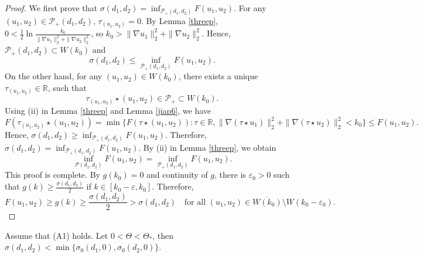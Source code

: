 \documentclass[reqno]{amsart}
\begin{document}
\begin{proof}
We first prove that $\sigma(d_1,d_2)=\inf_{\mathcal{P}_+(d_1,d_2)}F(u_1,u_2)$.
For any $(u_1,u_2)\in\mathcal{P}_+(d_1,d_2)$, $\tau_{(u_1,u_2)}=0$. 
By Lemma \ref{threep},
$0<\frac{1}{2}\ln\frac{k_0}{\| \nabla u_1\|_2^2+\| \nabla u_2\|_2^2}$,
so $k_0>\| \nabla u_1\|_2^2+
\| \nabla u_2\|_2^2$. Hence, $\mathcal{P}_+(d_1,d_2)\subset W(k_0)$ and
\[
\sigma(d_1,d_2)\leq\inf_{\mathcal{P}_+(d_1,d_2)}F(u_1,u_2).
\]
On the other hand, for any $(u_1,u_2)\in W(k_0)$, there exists a unique
$\tau_{(u_1,u_2)}\in\mathbb{R}$, such that
\[
\tau_{(u_1,u_2)}\star(u_1,u_2)\in\mathcal{P}_+\subset W(k_0).
\]
Using (ii) in Lemma \ref{threep} and Lemma \ref{jiap6}, we have
\[
F(\tau_{(u_1,u_2)}\star(u_1,u_2))=\min\{F(\tau\star(u_1,u_2)):\tau\in\mathbb{R},\| \nabla(\tau\star u_1)\|_2^2+\|
\nabla(\tau\star u_2)\|_2^2<k_0\}\leq F(u_1,u_2).
\]
Hence, $\sigma(d_1,d_2)\geq\inf_{\mathcal{P}_+(d_1,d_2)}F(u_1,u_2)$. Therefore,
$\sigma(d_1,d_2)=\inf_{\mathcal{P}_+(d_1,d_2)}F(u_1,u_2)$.
By (ii) in Lemma \ref{threep}, we obtain
\[
 \inf_{\mathcal{P}(d_1,d_2)}F(u_1,u_2)=\inf_{\mathcal{P}_+(d_1,d_2)}F(u_1,u_2).
\]
This proof is complete.
By $g(k_0)=0$ and continuity of $g$, there is $\varepsilon_0>0$ such that
$g(k)\geq\frac{\sigma(d_1,d_2)}{2}$ if $k\in[k_0-\varepsilon,k_0]$. Therefore,
\[
F(u_1,u_2)\geq g(k)\geq\frac{\sigma(d_1,d_2)}{2}>\sigma(d_1,d_2) \quad
\text{for all } (u_1,u_2)\in\overline{W(k_0)}\setminus W(k_0-\varepsilon_0).
\]
\end{proof}

\begin{lemma}\label{bijia}
Assume that {\rm(A1)} holds. Let $0<\Theta<\Theta_*$, then
$\sigma(d_1,d_2)<\min\{\sigma_0(d_1,0),\sigma_0(d_2,0)\}$.
\end{lemma}
\end{document}
